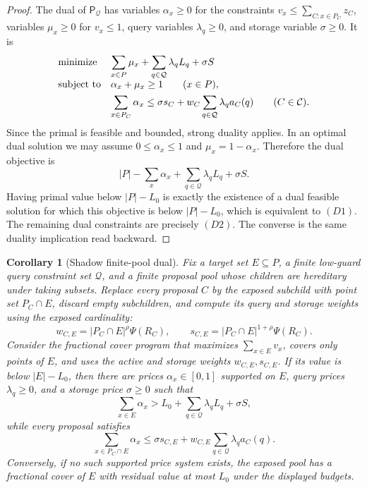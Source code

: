 \documentclass[10pt]{article}
\newtheorem{corollary}[theorem]{Corollary}
\theoremstyle{definition}
\begin{document}
\begin{proof}
   The dual of $\mathsf{P}_{\mathcal Q}$ has variables $\alpha_x\ge0$ for the
   constraints $v_x\le\sum_{C:x\in P_C}z_C$, variables $\mu_x\ge0$ for
   $v_x\le1$, query variables $\lambda_q\ge0$, and storage variable
   $\sigma\ge0$.  It is
   \[
   \begin{array}{ll}
   \text{\rm minimize}
      & \displaystyle
        \sum_{x\in P}\mu_x
        +\sum_{q\in\mathcal Q}\lambda_qL_q+\sigma S\\[0.8em]
   \text{\rm subject to}
      & \alpha_x+\mu_x\ge1
        \qquad (x\in P),\\[0.4em]
      & \displaystyle
        \sum_{x\in P_C}\alpha_x
        \le
        \sigma s_C+
        w_C\sum_{q\in\mathcal Q}\lambda_q a_C(q)
        \qquad (C\in\mathcal C).
   \end{array}
   \]
   Since the primal is feasible and bounded, strong duality applies.  In an
   optimal dual solution we may assume $0\le\alpha_x\le1$ and
   $\mu_x=1-\alpha_x$.  Therefore the dual objective is
   \[
      |P|-\sum_x\alpha_x+
      \sum_{q\in\mathcal Q}\lambda_qL_q+\sigma S .
   \]
   Having primal value below $|P|-L_0$ is exactly the existence of a dual
   feasible solution for which this objective is below $|P|-L_0$, which is
   equivalent to \((D1)\).  The remaining dual constraints are precisely
   \((D2)\).  The converse is the same duality implication read backward.
\end{proof}

\begin{corollary}[Shadow finite-pool dual]\label{cor:shadow-finite-pool-dual}
   Fix a target set $E\subseteq P$, a finite low-guard query constraint set
   $\mathcal Q$, and a finite proposal pool whose children are hereditary under
   taking subsets.  Replace every proposal $C$ by the exposed subchild with
   point set $P_C\cap E$, discard empty subchildren, and compute its query and
   storage weights using the exposed cardinality:
   \[
      w_{C,E}=|P_C\cap E|^\rho\Psi(R_C),
      \qquad
      s_{C,E}=|P_C\cap E|^{1+\rho}\Psi(R_C).
   \]
   Consider the fractional cover program that maximizes
   $\sum_{x\in E}v_x$, covers only points of $E$, and uses the active and
   storage weights $w_{C,E},s_{C,E}$.  If its value is below $|E|-L_0$, then
   there are prices $\alpha_x\in[0,1]$ supported on $E$, query prices
   $\lambda_q\ge0$, and a storage price $\sigma\ge0$ such that
   \[
      \sum_{x\in E}\alpha_x
      >
      L_0+\sum_{q\in\mathcal Q}\lambda_qL_q+\sigma S,
   \]
   while every proposal satisfies
   \[
      \sum_{x\in P_C\cap E}\alpha_x
      \le
      \sigma s_{C,E}
      +
      w_{C,E}\sum_{q\in\mathcal Q}\lambda_q a_C(q).
   \]
   Conversely, if no such supported price system exists, the exposed pool has a
   fractional cover of $E$ with residual value at most $L_0$ under the displayed
   budgets.
\end{corollary}
\end{document}
